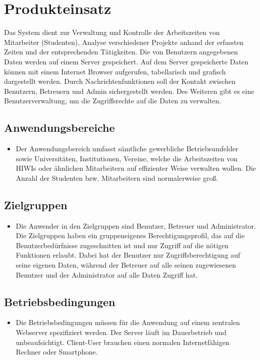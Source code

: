 \section{Produkteinsatz}
Das System dient zur Verwaltung und Kontrolle der Arbeitszeiten von Mitarbeiter (Studenten), Analyse verschiedener Projekte anhand der erfassten Zeiten und der entsprechenden Tätigkeiten. Die von Benutzern angegebenen Daten werden auf einem Server gespeichert. Auf dem Server gespeicherte Daten können mit einem Internet Browser aufgerufen, tabellarisch und grafisch dargestellt werden. Durch Nachrichtenfunktionen soll der Kontakt zwischen Benutzern, Betreuern und Admin sichergestellt werden. Des Weiteren gibt es eine Benutzerverwaltung, um die Zugriffsrechte auf die Daten zu verwalten.
\subsection{Anwendungsbereiche}
\begin{itemize}
	\item Der Anwendungsbereich umfasst sämtliche gewerbliche Betriebsumfelder sowie Universitäten, Institutionen, Vereine, welche die Arbeitszeiten von HIWIs oder ähnlichen Mitarbeitern auf effizienter Weise verwalten wollen. Die Anzahl der Studenten bzw. Mitarbeitern sind normalerweise groß.
\end{itemize}

\subsection{Zielgruppen}
\begin{itemize}
	\item Die Anwender in den Zielgruppen sind Benutzer, Betreuer und Administrator. Die Zielgruppen haben ein gruppeneigenes Berechtigungsprofil, das auf die Benutzerbedürfnisse zugeschnitten ist und nur Zugriff auf die nötigen Funktionen erlaubt. Dabei hat der Benutzer nur Zugriffsberechtigung auf seine eigenen Daten, während der Betreuer auf alle seinen zugewiesenen Benutzer und der Administrator auf alle Daten Zugriff hat.
\end{itemize}

\subsection{Betriebsbedingungen}
\begin{itemize}
	\item Die Betriebsbedingungen müssen für die Anwendung auf einem zentralen Webserver spezifiziert werden. Der Server läuft im Dauerbetrieb und unbeaufsichtigt. Client-User brauchen einen normalen Internetfähigen Rechner oder Smartphone.
\end{itemize}
